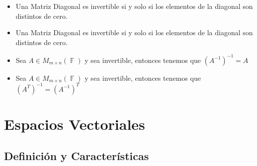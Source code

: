\documentclass[12pt, fleqn]{report}                             %
\newenvironment{SmallIndentation}[1][0.75em]                    %
        {\begin{adjustwidth}{#1}{}\begin{footnotesize}}             %
        {\end{footnotesize}\end{adjustwidth}}                       %
\theoremstyle{break}                                            %
\DeclareMathOperator \GenericField {\mathbb{F}}                 %
\begin{document}
\begin{itemize}
\begin{SmallIndentation}[1em]
                        \end{SmallIndentation}

                    \clearpage

                    \item Una Matriz Diagonal es invertible si y solo si los elementos de la diagonal
                        son distintos de cero.

                    \item Una Matriz Diagonal es invertible si y solo si los elementos de la diagonal
                        son distintos de cero.

                    \item Sea $A \in M_{m \times n}(\GenericField)$ y sea invertible, entonces tenemos
                        que $(A^{-1})^{-1} = A$

                    \item Sea $A \in M_{m \times n}(\GenericField)$ y sea invertible, entonces tenemos
                        que $(A^T)^{-1} = (A^{-1})^T$

                \end{itemize}
            






\part{Espacios Vectoriales}
\clearpage


    \chapter{Definición y Características}

        \clearpage
\end{document}
